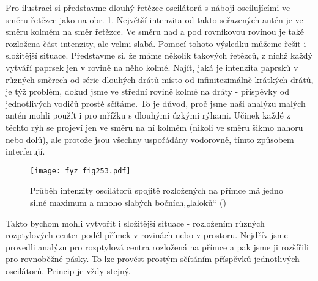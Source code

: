 {    Pro ilustraci si představme dlouhý řetězec oscilátorů s náboji oscilujícími ve směru řetězce 
    jako na obr. \ref{fyz:fig253}. Největší intenzita od takto seřazených antén je ve směru kolmém 
    na směr řetězce. Ve směru nad a pod rovníkovou rovinou je také rozložena část intenzity, ale 
    velmi slabá. Pomocí tohoto výsledku můžeme řešit i složitější situace. Představme si, že máme 
    několik takových řetězců, z nichž každý vytváří paprsek jen v rovině na něho kolmé. Najít, jaká 
    je intenzita paprsků v různých směrech od série dlouhých drátů místo od infinitezimálně 
    krátkých drátů, je týž problém, dokud jsme ve střední rovině kolmé na dráty - příspěvky od 
    jednotlivých vodičů prostě sčítáme. To je důvod, proč jsme naši analýzu malých antén mohli 
    použít i pro mřížku s dlouhými úzkými rýhami. Učinek každé z těchto rýh se projeví jen ve směru 
    na ní kolmém (nikoli ve směru šikmo nahoru nebo dolů), ale protože jsou všechny uspořádány 
    vodorovně, tímto způsobem interferují.

    \begin{figure}[ht!] %
      \centering
      \texttt{[image: fyz\_fig253.pdf]}
      \caption{Průběh intenzity oscilátorů spojitě rozložených na přímce má jedno silné maximum a 
               mnoho slabých bočních,„laloků“
               (\cite[s.~398]{Feynman01})}
      \label{fyz:fig253}
    \end{figure}
    
    Takto bychom mohli vytvořit i složitější situace - rozložením různých rozptylových center podél 
    přímek v rovinách nebo v prostoru. Nejdřív jsme provedli analýzu pro rozptylová centra 
    rozložená na přímce a pak jsme ji rozšířili pro rovnoběžné pásky. To lze provést prostým 
    sčítáním příspěvků jednotlivých oscilátorů. Princip je vždy stejný.
    
}
